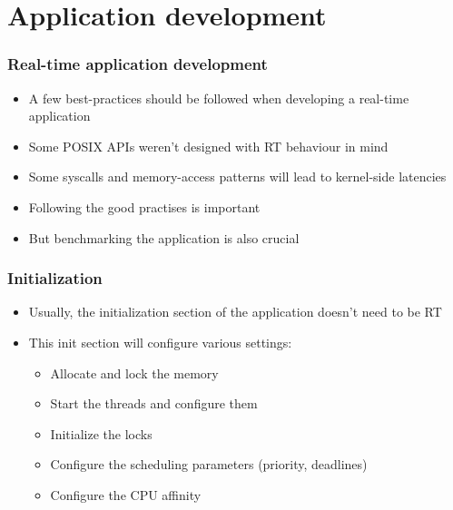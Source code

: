 \section{Application development}

\begin{frame}
\frametitle{Real-time application development}
        \begin{itemize}
                \item A few best-practices should be followed when developing a real-time application
                \item Some POSIX APIs weren't designed with RT behaviour in mind
                \item Some syscalls and memory-access patterns will lead to kernel-side latencies
                \item Following the good practises is important
                \item But benchmarking the application is also crucial
        \end{itemize}
\end{frame}

\begin{frame}
        \frametitle{Initialization}
        \begin{itemize}
                \item Usually, the initialization section of the application doesn't need to be RT
                \item This init section will configure various settings:
                        \begin{itemize}
                                \item Allocate and lock the memory
                                \item Start the threads and configure them
                                \item Initialize the locks
                                \item Configure the scheduling parameters (priority, deadlines)
                                \item Configure the CPU affinity
                        \end{itemize}

        \end{itemize}
\end{frame}

